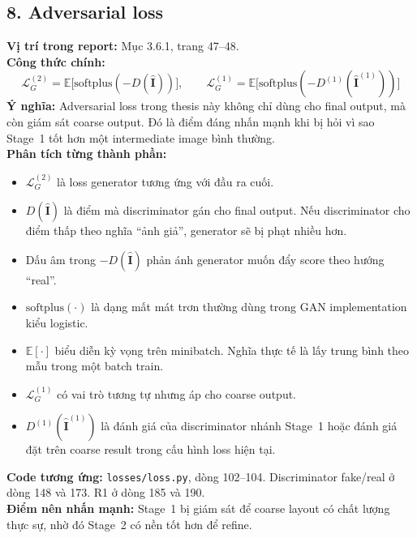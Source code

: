 \documentclass[12pt,a4paper]{article}
\begin{document}
\subsection*{8. Adversarial loss}
\textbf{Vị trí trong report:} Mục 3.6.1, trang 47--48.\\
\textbf{Công thức chính:}
\[
\mathcal{L}_{G}^{(2)} = \mathbb{E}\big[\mathrm{softplus}(-D(\hat{\mathbf{I}}))\big], \qquad
\mathcal{L}_{G}^{(1)} = \mathbb{E}\big[\mathrm{softplus}(-D^{(1)}(\hat{\mathbf{I}}^{(1)}))\big]
\]
\textbf{Ý nghĩa:} Adversarial loss trong thesis này không chỉ dùng cho final output, mà còn giám sát coarse output. Đó là điểm đáng nhấn mạnh khi bị hỏi vì sao Stage~1 tốt hơn một intermediate image bình thường.\\
\textbf{Phân tích từng thành phần:}
\begin{itemize}[leftmargin=1.5em]
\item $\mathcal{L}_{G}^{(2)}$ là loss generator tương ứng với đầu ra cuối.
\item $D(\hat{\mathbf{I}})$ là điểm mà discriminator gán cho final output. Nếu discriminator cho điểm thấp theo nghĩa ``ảnh giả'', generator sẽ bị phạt nhiều hơn.
\item Dấu âm trong $-D(\hat{\mathbf{I}})$ phản ánh generator muốn đẩy score theo hướng ``real''.
\item $\mathrm{softplus}(\cdot)$ là dạng mất mát trơn thường dùng trong GAN implementation kiểu logistic.
\item $\mathbb{E}[\cdot]$ biểu diễn kỳ vọng trên minibatch. Nghĩa thực tế là lấy trung bình theo mẫu trong một batch train.
\item $\mathcal{L}_{G}^{(1)}$ có vai trò tương tự nhưng áp cho coarse output.
\item $D^{(1)}(\hat{\mathbf{I}}^{(1)})$ là đánh giá của discriminator nhánh Stage~1 hoặc đánh giá đặt trên coarse result trong cấu hình loss hiện tại.
\end{itemize}
\textbf{Code tương ứng:} \texttt{losses/loss.py}, dòng 102--104. Discriminator fake/real ở dòng 148 và 173. R1 ở dòng 185 và 190.\\
\textbf{Điểm nên nhấn mạnh:} Stage~1 bị giám sát để coarse layout có chất lượng thực sự, nhờ đó Stage~2 có nền tốt hơn để refine.
\end{document}
